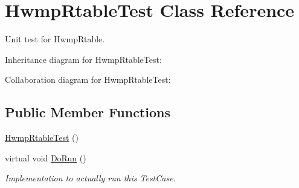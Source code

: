 \hypertarget{classHwmpRtableTest}{}\section{Hwmp\+Rtable\+Test Class Reference}
\label{classHwmpRtableTest}


Unit test for Hwmp\+Rtable.  




Inheritance diagram for Hwmp\+Rtable\+Test\+:


Collaboration diagram for Hwmp\+Rtable\+Test\+:
\subsection*{Public Member Functions}
\begin{DoxyCompactItemize}
\item 
\hyperlink{classHwmpRtableTest_a466eb52951e44eabeb1a34337b720cf4}{Hwmp\+Rtable\+Test} ()
\item 
virtual void \hyperlink{classHwmpRtableTest_aeba47e3dbdade2299df5fb28e4cc7f49}{Do\+Run} ()
\begin{DoxyCompactList}\small\item\em Implementation to actually run this Test\+Case. \end{DoxyCompactList}\end{DoxyCompactItemize}
